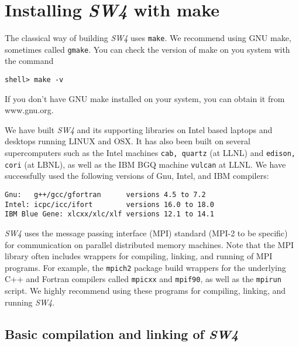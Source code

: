 \documentclass[11pt]{article}
\begin{document}
\section{Installing \emph{SW4} with make}\label{cha:installing-sw4}


The classical way of building \emph{SW4} uses \verb+make+. We recommend using GNU make, sometimes called
\verb+gmake+. You can check the version of make on you system with the command
\begin{verbatim}
shell> make -v
\end{verbatim}
If you don't have GNU make installed on your system, you can obtain it from www.gnu.org.

We have built \emph{SW4} and its supporting libraries on Intel based laptops and desktops running
LINUX and OSX. It has also been built on several supercomputers such as the Intel machines {\tt cab,
quartz}
(at LLNL) and {\tt edison, cori} (at LBNL), as well as the IBM BGQ machine {\tt vulcan} at LLNL. We have
successfully used the following versions of Gnu, Intel, and IBM compilers:
\begin{verbatim}
Gnu:   g++/gcc/gfortran      versions 4.5 to 7.2
Intel: icpc/icc/ifort        versions 16.0 to 18.0
IBM Blue Gene: xlcxx/xlc/xlf versions 12.1 to 14.1
\end{verbatim}

\emph{SW4} uses the message passing interface (MPI) standard (MPI-2 to be specific) for
communication on parallel distributed memory machines. Note that the MPI library often includes
wrappers for compiling, linking, and running of MPI programs. For example, the {\tt mpich2} package
build wrappers for the underlying C++ and Fortran compilers called {\tt mpicxx} and {\tt mpif90}, as
well as the {\tt mpirun} script. We highly recommend using these programs for compiling, linking,
and running \emph{SW4}.


\subsection{Basic compilation and linking of \emph{SW4}}\label{sec:basic-install}
\end{document}
